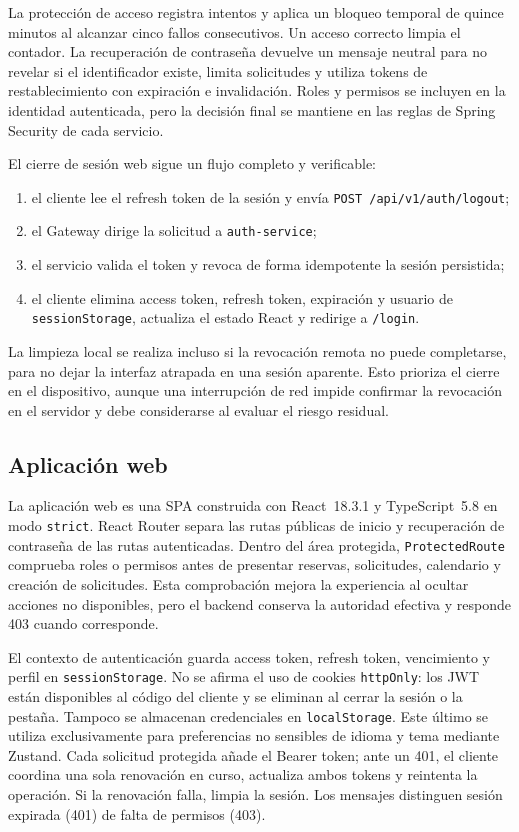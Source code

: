 La protección de acceso registra intentos y aplica un bloqueo temporal de quince
minutos al alcanzar cinco fallos consecutivos. Un acceso correcto limpia el
contador. La recuperación de contraseña devuelve un mensaje neutral para no
revelar si el identificador existe, limita solicitudes y utiliza tokens de
restablecimiento con expiración e invalidación. Roles y permisos se incluyen en
la identidad autenticada, pero la decisión final se mantiene en las reglas de
Spring Security de cada servicio.

El cierre de sesión web sigue un flujo completo y verificable:

\begin{enumerate}
  \item el cliente lee el refresh token de la sesión y envía
        \texttt{POST /api/v1/auth/logout};
  \item el Gateway dirige la solicitud a \texttt{auth-service};
  \item el servicio valida el token y revoca de forma idempotente la sesión
        persistida;
  \item el cliente elimina access token, refresh token, expiración y usuario de
        \texttt{sessionStorage}, actualiza el estado React y redirige a
        \texttt{/login}.
\end{enumerate}

La limpieza local se realiza incluso si la revocación remota no puede
completarse, para no dejar la interfaz atrapada en una sesión aparente. Esto
prioriza el cierre en el dispositivo, aunque una interrupción de red impide
confirmar la revocación en el servidor y debe considerarse al evaluar el riesgo
residual.

\subsection{Aplicación web}
\label{subsec:aplicacion-web}

La aplicación web es una SPA construida con React~18.3.1 y TypeScript~5.8 en
modo \texttt{strict}. React Router separa las rutas públicas de inicio y
recuperación de contraseña de las rutas autenticadas. Dentro del área protegida,
\texttt{ProtectedRoute} comprueba roles o permisos antes de presentar reservas,
solicitudes, calendario y creación de solicitudes. Esta comprobación mejora la
experiencia al ocultar acciones no disponibles, pero el backend conserva la
autoridad efectiva y responde 403 cuando corresponde.

El contexto de autenticación guarda access token, refresh token, vencimiento y
perfil en \texttt{sessionStorage}. No se afirma el uso de cookies
\texttt{httpOnly}: los JWT están disponibles al código del cliente y se eliminan
al cerrar la sesión o la pestaña. Tampoco se almacenan credenciales en
\texttt{localStorage}. Este último se utiliza exclusivamente para preferencias
no sensibles de idioma y tema mediante Zustand. Cada solicitud protegida añade
el Bearer token; ante un 401, el cliente coordina una sola renovación en curso,
actualiza ambos tokens y reintenta la operación. Si la renovación falla, limpia
la sesión. Los mensajes distinguen sesión expirada (401) de falta de permisos
(403).

